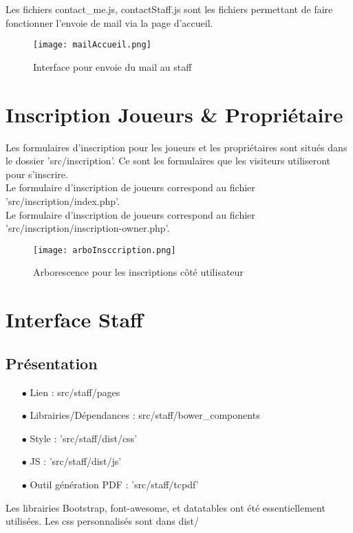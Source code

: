 \documentclass{article}
\begin{document}
Les fichiers contact\_me.js, contactStaff.js sont les fichiers permettant de faire fonctionner l'envoie de mail via la page d'accueil.\\
\begin{figure}[h!]
\centering
\texttt{[image: mailAccueil.png]}
\caption{Interface pour envoie du mail au staff}
\end{figure}

\section{Inscription Joueurs \& Propriétaire}
Les formulaires d'inscription pour les joueurs et les propriétaires sont situés dans le dossier 'src/inscription'. Ce sont les formulaires que les visiteurs utiliseront pour s'inscrire.\\
Le formulaire d'inscription de joueurs correspond au fichier 'src/inscription/index.php'.\\
Le formulaire d'inscription de joueurs correspond au fichier 'src/inscription/inscription-owner.php'.\\

\begin{figure}[h!]
\centering
\texttt{[image: arboInsccription.png]}
\caption{Arborescence pour les inscriptions côté utilisateur}
\end{figure}


\section{Interface Staff}

\subsection{Présentation}

\begin{itemize}
\item[$\bullet$] Lien : src/staff/pages
\item[$\bullet$] Librairies/Dépendances : src/staff/bower\_components
\item[$\bullet$] Style : 'src/staff/dist/css'
\item[$\bullet$] JS : 'src/staff/dist/js'
\item[$\bullet$] Outil génération PDF : 'src/staff/tcpdf'
\end{itemize}

Les librairies Bootstrap, font-awesome, et datatables ont été essentiellement utilisées.
Les css personnalisés sont dans dist/
\end{document}
